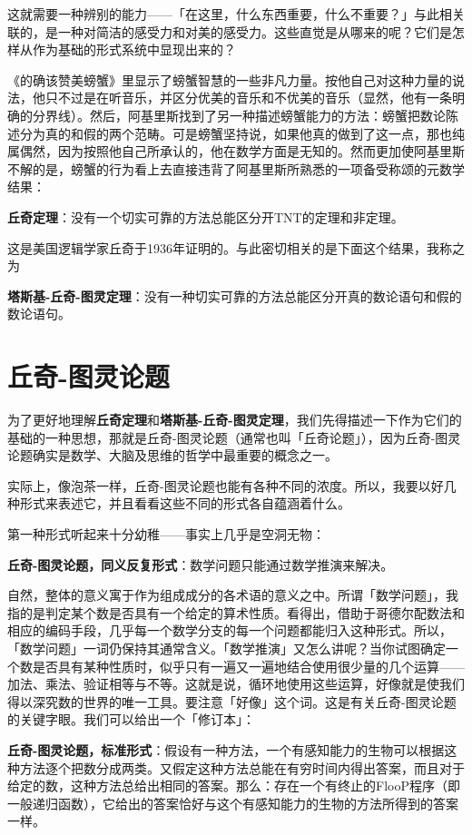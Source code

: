 \documentclass[
  12pt,
  twoside,
  openright,
  oldfontcommands,
]{memoir}
\newcommand{\heititext}[1]{{\heifamily\bfseries #1}}
\begin{document}
这就需要一种辨别的能力------「在这里，什么东西重要，什么不重要？」与此相关联的，是一种对简洁的感受力和对美的感受力。这些直觉是从哪来的呢？它们是怎样从作为基础的形式系统中显现出来的？

《的确该赞美螃蟹》里显示了螃蟹智慧的一些非凡力量。按他自己对这种力量的说法，他只不过是在听音乐，并区分优美的音乐和不优美的音乐（显然，他有一条明确的分界线）。然后，阿基里斯找到了另一种描述螃蟹能力的方法：螃蟹把数论陈述分为真的和假的两个范畴。可是螃蟹坚持说，如果他真的做到了这一点，那也纯属偶然，因为按照他自己所承认的，他在数学方面是无知的。然而更加使阿基里斯不解的是，螃蟹的行为看上去直接违背了阿基里斯所熟悉的一项备受称颂的元数学结果：

\heititext{丘奇定理}：没有一个切实可靠的方法总能区分开TNT的定理和非定理。

这是美国逻辑学家丘奇于1936年证明的。与此密切相关的是下面这个结果，我称之为

\heititext{塔斯基-丘奇-图灵定理}：没有一种切实可靠的方法总能区分开真的数论语句和假的数论语句。

\section{丘奇-图灵论题}

为了更好地理解\heititext{丘奇定理}和\heititext{塔斯基-丘奇-图灵定理}，我们先得描述一下作为它们的基础的一种思想，那就是丘奇-图灵论题（通常也叫「丘奇论题」），因为丘奇-图灵论题确实是数学、大脑及思维的哲学中最重要的概念之一。

实际上，像泡茶一样，丘奇-图灵论题也能有各种不同的浓度。所以，我要以好几种形式来表述它，并且看看这些不同的形式各自蕴涵着什么。

第一种形式听起来十分幼稚------事实上几乎是空洞无物：

\heititext{丘奇-图灵论题，同义反复形式}：数学问题只能通过数学推演来解决。

自然，整体的意义寓于作为组成成分的各术语的意义之中。所谓「数学问题」，我指的是判定某个数是否具有一个给定的算术性质。看得出，借助于哥德尔配数法和相应的编码手段，几乎每一个数学分支的每一个问题都能归入这种形式。所以，「数学问题」一词仍保持其通常含义。「数学推演」又怎么讲呢？当你试图确定一个数是否具有某种性质时，似乎只有一遍又一遍地结合使用很少量的几个运算------加法、乘法、验证相等与不等。这就是说，循环地使用这些运算，好像就是使我们得以深究数的世界的唯一工具。要注意「好像」这个词。这是有关丘奇-图灵论题的关键字眼。我们可以给出一个「修订本」：

\heititext{丘奇-图灵论题，标准形式}：假设有一种方法，一个有感知能力的生物可以根据这种方法逐个把数分成两类。又假定这种方法总能在有穷时间内得出答案，而且对于给定的数，这种方法总给出相同的答案。那么：存在一个有终止的FlooP程序（即一般递归函数），它给出的答案恰好与这个有感知能力的生物的方法所得到的答案一样。
\end{document}
